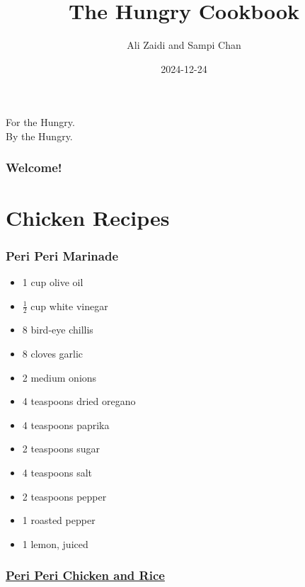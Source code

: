\documentclass[]{article}
\title{The Hungry Cookbook}
\author{Ali Zaidi and Sampi Chan}
\date{2024-12-24}
\providecommand{\tightlist}{%
  \setlength{\itemsep}{0pt}\setlength{\parskip}{0pt}}
\begin{document}
\maketitle


\begin{center}
For the Hungry. \\
By the Hungry.

\end{center}

{
\setcounter{tocdepth}{2}
\tableofcontents
}
\hypertarget{welcome}{%
\section*{Welcome!}\label{welcome}}

\hypertarget{part-chicken-recipes}{%
\part{Chicken Recipes}\label{part-chicken-recipes}}

\hypertarget{peri-peri-marinade}{%
\section{Peri Peri Marinade}\label{peri-peri-marinade}}

\begin{itemize}
\tightlist
\item
  1 cup olive oil
\item
  \(\frac{1}{2}\) cup white vinegar
\item
  8 bird-eye chillis
\item
  8 cloves garlic
\item
  2 medium onions
\item
  4 teaspoons dried oregano
\item
  4 teaspoons paprika
\item
  2 teaspoons sugar
\item
  4 teaspoons salt
\item
  2 teaspoons pepper
\item
  1 roasted pepper
\item
  1 lemon, juiced
\end{itemize}

\hypertarget{peri-peri-chicken-and-rice}{%
\section{\texorpdfstring{\href{https://www.moribyan.com/recipe-view/peri-peri-style-chicken-and-rice/}{Peri Peri Chicken and Rice}}{Peri Peri Chicken and Rice}}\label{peri-peri-chicken-and-rice}}
\end{document}
